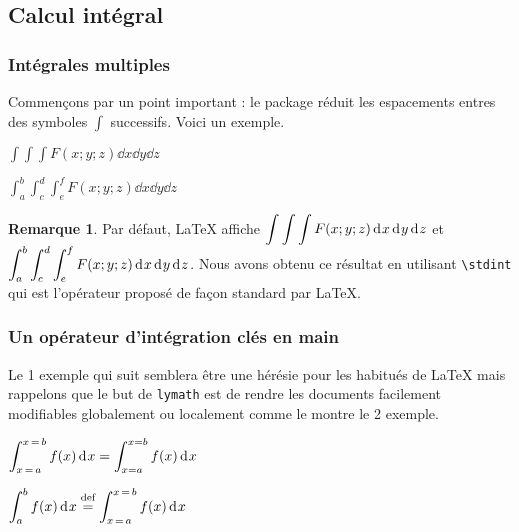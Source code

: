 \documentclass[12pt,a4paper]{article}
\makeatletter
\newcommand\env[1]{\texttt{#1}}
\newcommand\macro[1]{\env{\textbackslash{}#1}}
\theoremstyle{definition}
\newtheorem*{remark}{Remarque}
\newcounter{paraexample}[subsubsection]
\newcommand\@newexample@abstract[2]{%
	\paragraph{%
		#1%
		\if\relax\detokenize{#2}\relax\else {} -- #2\fi%
	}%
}
\newcommand\newparaexample{\@ifstar{\@newparaexample@star}{\@newparaexample@no@star}}
\newcommand\@newparaexample@no@star[1]{%
	\refstepcounter{paraexample}%
	\@newexample@abstract{Exemple \theparaexample}{#1}%
}
\newcommand\@newparaexample@star[1]{%
	\@newexample@abstract{Exemple}{#1}%
}
\makeatother
\begin{document}

\subsection{Calcul intégral}

\subsubsection{Intégrales multiples}

Commençons par un point important : le package réduit les espacements entres des symboles $\int$ successifs. Voici un exemple.

\begin{latexex}
$\displaystyle
 \int \int \int 
 F(x;y;z) \dd{x} \dd{y} \dd{z}$

$\displaystyle
 \int_{a}^{b} \int_{c}^{d} \int_{e}^{f} 
 F(x;y;z) \dd{x} \dd{y} \dd{z}$
\end{latexex}


\begin{remark}
	Par défaut, \LaTeX{} affiche
	$\displaystyle
	 \stdint \stdint \stdint
	 F(x;y;z) \dd{x} \dd{y} \dd{z}$
    et
    $\displaystyle
	 \stdint_{a}^{b} \stdint_{c}^{d} \stdint_{e}^{f}
     F(x;y;z) \dd{x} \dd{y} \dd{z}$.
    Nous avons obtenu ce résultat en utilisant \macro{stdint} qui est l'opérateur proposé de façon standard par \LaTeX.
\end{remark}




\subsubsection{Un opérateur d'intégration clés en main}

\newparaexample{À quoi bon ?}

Le 1\ier{} exemple qui suit semblera être une hérésie pour les habitués de \LaTeX{} mais rappelons que le but de \verb+lymath+ est de rendre les documents facilement modifiables globalement ou localement comme le montre le 2\ieme{} exemple.

\begin{latexex}
 $\displaystyle
  \integrate{a}{b}{f(x)}{x}
= \int_{x=a}^{x=b} f(x) \dd{x}$

 $\displaystyle
  \integrate*{a}{b}{f(x)}{x}
  \eqdef
  \integrate{a}{b}{f(x)}{x}$
\end{latexex}
\end{document}
